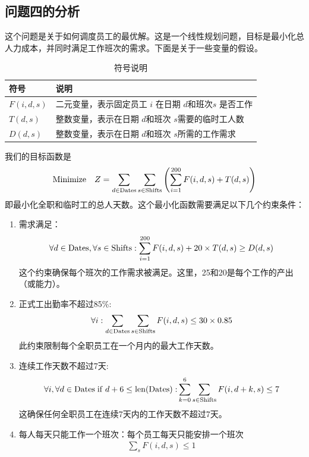 \documentclass[UTF8]{article}%
\begin{document}
\subsection{问题四的分析}

这个问题是关于如何调度员工的最优解。这是一个线性规划问题，目标是最小化总人力成本，并同时满足工作班次的需求。下面是关于一些变量的假设。


\begin{table}[!ht]
\renewcommand\arraystretch{1.2}
\caption{符号说明}%
\centering%
\begin{tabular}{p{4cm}<{\centering}p{10cm}<{\centering}}%
\toprule%
符号&说明 \\
\midrule%
$F(i,d,s)$&二元变量，表示固定员工 $i$ 在日期 $d $和班次$ s$ 是否工作\\
$T(d,s)$&整数变量，表示在日期 $d $和班次 $s $需要的临时工人数\\
$D(d,s)$&整数变量，表示在日期 $d $和班次 $s $所需的工作需求\\
\bottomrule%
\end{tabular}
\end{table}
我们的目标函数是
\begin{align*}
    {\rm Minimize}\quad Z =\sum_{d\in {\rm Dates}}\sum_{s\in {\rm Shifts}}\left(\sum_{i = 1}^{200}F(i,d,s)+T(d,s)\right)
\end{align*}
即最小化全职和临时工的总人天数。这个最小化函数需要满足以下几个约束条件：
\begin{enumerate}
    \item 需求满足：\begin{align*}
        \forall d\in {\rm Dates},\forall s\in {\rm Shifts}:\sum_{i = 1}^{200}F(i,d,s)+20\times T(d,s)\geq D(d,s)
    \end{align*}
    这个约束确保每个班次的工作需求被满足。这里，25和20是每个工作的产出（或能力）。
    \item 正式工出勤率不超过85\%: \begin{align*}
        \forall i:\sum_{d\in {\rm Dates}}\sum_{s\in {\rm Shifts}}F(i,d,s)\leq 30 \times 0.85
    \end{align*}此约束限制每个全职员工在一个月内的最大工作天数。
    \item 连续工作天数不超过7天:\begin{align*}
        \forall i,\forall d\in {\rm Dates\; if \;} d+6 \leq{\rm len(Dates):}\sum_{k =0}^6\sum_{s\in {\rm Shifts}}   F(i,d+k,s)\leq 7
    \end{align*}这确保任何全职员工在连续7天内的工作天数不超过7天。
    \item 每人每天只能工作一个班次：每个员工每天只能安排一个班次\begin{align*}
        \sum_s F(i,d,s)\leq 1
    \end{align*}
\end{enumerate}
\end{document}
